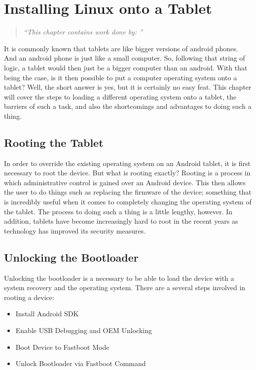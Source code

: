 \chapter{Installing Linux onto a Tablet}
\begin{quote}\it
``This chapter contains work done by: ''
\end{quote}
\label{chapter: Installing Linux onto a Tablet}

It is commonly known that tablets are like bigger versions of android phones. And an android phone is just like a small computer. So, following that string of logic, a tablet would then 
just be a bigger computer than an android. With that being the case, is it then possible to put a computer operating system onto a tablet? Well, the short answer is yes, but it is certainly 
no easy feat. This chapter will cover the steps to loading a different operating system onto a tablet, the barriers of such a task, and also the shortcomings and advantages to doing such 
a thing. 

\section{Rooting the Tablet}
In order to override the existing operating system on an Android tablet, it is first necessary to root the device. But what is rooting exactly? Rooting is a process in which 
administrative control is gained over an Android device. This then allows the user to do things such as replacing the firmware of the device; something that is incredibly
useful when it comes to completely changing the operating system of the tablet. The process to doing such a thing is a little lengthy, however. In addition, tablets
have become increasingly hard to root in the recent years as technology has improved its security measures.

\section{Unlocking the Bootloader}
Unlocking the bootloader is a necessary to be able to load the device with a system recovery and the operating system. There are a several steps involved in rooting a device:
\begin{itemize}

\item Install Android SDK
\item Enable USB Debugging and OEM Unlocking
\item Boot Device to Fastboot Mode
\item Unlock Bootloader via Fastboot Command

\end{itemize}

